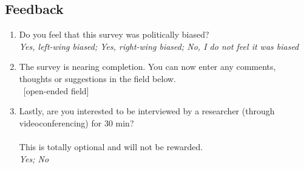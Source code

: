 \subsection*{Feedback}
\begin{enumerate}[resume]
\item Do you feel that this survey was politically biased?
\\ \textit{Yes, left-wing biased; Yes, right-wing biased; No, I do not feel it was biased}
\item The survey is nearing completion. You can now enter any comments, thoughts or suggestions in the field below.
\\ ~[open-ended field]
\item Lastly, are you interested to be interviewed by a researcher (through videoconferencing) for 30 min? \\
\\
This is totally optional and will not be rewarded.
\\ \textit{Yes; No}
\end{enumerate}

